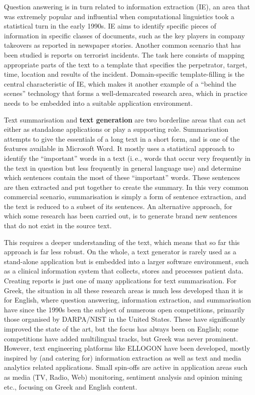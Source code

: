 \begin{multicols}{2}
Question answering is in turn related to information extraction (IE), an area that was extremely popular and influential when computational linguistics took a statistical turn in the early 1990s. IE aims to identify specific pieces of information in specific classes of documents, such as the key players in company takeovers as reported in newspaper stories. Another common scenario that has been studied is reports on terrorist incidents. The task here consists of mapping appropriate parts of the text to a template that specifies the perpetrator, target, time, location and results of the incident. Domain-specific template-filling is the central characteristic of IE, which makes it another example of a “behind the scenes” technology that forms a well-demarcated research area, which in practice needs to be embedded into a suitable application environment. 

Text summarisation and \textbf{text generation} are two borderline areas that can act either as standalone applications or play a supporting role. Summarisation attempts to give the essentials of a long text in a short form, and is one of the features available in Microsoft Word. It mostly uses a statistical approach to identify the “important” words in a text (i.\,e., words that occur very frequently in the text in question but less frequently in general language use) and determine which sentences contain the most of these “important” words. These sentences are then extracted and put together to create the summary. In this very common commercial scenario, summarisation is simply a form of sentence extraction, and the text is reduced to a subset of its sentences. An alternative approach, for which some research has been carried out, is to generate brand new sentences that do not exist in the source text. 


This requires a deeper understanding of the text, which means that so far this approach is far less robust. On the whole, a text generator is rarely used as a stand-alone application but is embedded into a larger software environment, such as a clinical information system that collects, stores and processes patient data. Creating reports is just one of many applications for text summarisation. 
For Greek, the situation in all these research areas is much less developed than it is for English, where question answering, information extraction, and summarisation have since the 1990s been the subject of numerous open competitions, primarily those organised by DARPA/NIST in the United States. These have significantly improved the state of the art, but the focus has always been on English; some competitions have added multilingual tracks, but Greek was never prominent. However, text engineering platforms like ELLOGON have been developed, mostly inspired by (and catering for) information extraction as well as text and media analytics related applications. Small spin-offs are active in application areas such as media (TV, Radio, Web) monitoring, sentiment analysis and opinion mining etc., focusing on Greek and English content.


\end{multicols}
